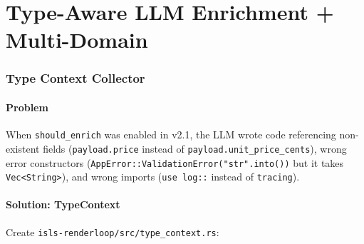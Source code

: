 \documentclass[11pt,a4paper]{article}
\begin{document}
\tableofcontents
\newpage

\part{Type-Aware LLM Enrichment + Multi-Domain}
\label{part:v22}

\section{Type Context Collector}

\subsection{Problem}

When \texttt{should\_enrich} was enabled in v2.1, the LLM wrote
code referencing non-existent fields (\texttt{payload.price} instead
of \texttt{payload.unit\_price\_cents}), wrong error constructors
(\texttt{AppError::ValidationError("str".into())} but it takes
\texttt{Vec<String>}), and wrong imports (\texttt{use log::} instead
of \texttt{tracing}).

\subsection{Solution: TypeContext}

Create \texttt{isls-renderloop/src/type\_context.rs}:
\end{document}
